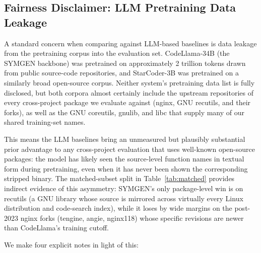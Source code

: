 \documentclass[sigconf,nonacm]{acmart}
\begin{document}
\subsection{Fairness Disclaimer: LLM Pretraining Data Leakage}
\label{sec:fairness}

A standard concern when comparing against LLM-based baselines is data leakage from the pretraining corpus into the evaluation set. CodeLlama-34B (the SYMGEN backbone) was pretrained on approximately 2 trillion tokens drawn from public source-code repositories, and StarCoder-3B was pretrained on a similarly broad open-source corpus. Neither system's pretraining data list is fully disclosed, but both corpora almost certainly include the upstream repositories of every cross-project package we evaluate against (nginx, GNU recutils, and their forks), as well as the GNU coreutils, gnulib, and libc that supply many of our shared training-set names.

This means the LLM baselines bring an unmeasured but plausibly substantial prior advantage to any cross-project evaluation that uses well-known open-source packages: the model has likely seen the source-level function names in textual form during pretraining, even when it has never been shown the corresponding stripped binary. The matched-subset split in Table~\ref{tab:matched} provides indirect evidence of this asymmetry: SYMGEN's only package-level win is on recutils (a GNU library whose source is mirrored across virtually every Linux distribution and code-search index), while it loses by wide margins on the post-2023 nginx forks (tengine, angie, nginx118) whose specific revisions are newer than CodeLlama's training cutoff.

We make four explicit notes in light of this:
\end{document}

